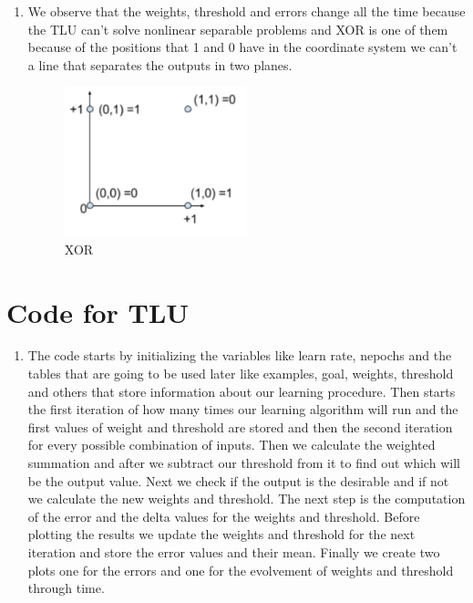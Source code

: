 \documentclass{article}
\begin{document}
\begin{enumerate}[{6}]
  \item We observe that the weights, threshold and errors change all the time because the TLU can’t solve nonlinear separable problems and XOR is one of them because of the positions that 1 and 0 have in the coordinate system we can’t a line that separates the outputs in two planes.
  \begin{figure}[!h]
    \centering
    \includegraphics[width=0.5\textwidth]{img/xor.png}
    \caption{XOR}
    \label{fig:diagram}
  \end{figure}
\end{enumerate}
\section{Code for TLU}
\begin{enumerate}
\item The code starts by initializing the variables like learn rate, nepochs and the tables that are going to be used later like examples, goal, weights, threshold and others that store information about our learning procedure. Then starts the first iteration of how many times our learning algorithm will run and the first values of weight and threshold are stored and then the second iteration for every possible combination of inputs. Then we calculate the weighted summation and after we subtract our threshold from it to find out which will be the output value. Next we check if the output is the desirable and if not we calculate the new weights and threshold. The next step is the computation of the error and the delta values for the weights and threshold. Before plotting the results we update the weights and threshold for the next iteration and store the error values and their mean. Finally we create two plots one for the errors and one for the evolvement of weights and threshold through time.

\end{enumerate}
\end{document}
